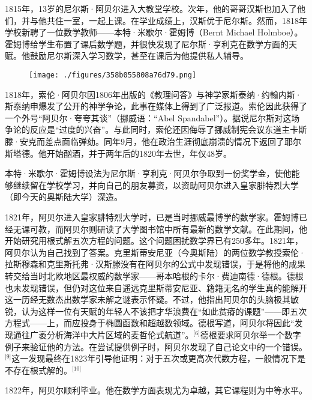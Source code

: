 1815年，13岁的尼尔斯·阿贝尔进入大教堂学校。次年，他的哥哥汉斯也加入了他们，并与他共住一室，一起上课。在学业成绩上，汉斯优于尼尔斯。然而，1818年学校新聘了一位数学教师——本特·米歇尔·霍姆博（Bernt Michael Holmboe）。霍姆博给学生布置了课后数学题，并很快发现了尼尔斯·亨利克在数学方面的天赋。他鼓励尼尔斯深入学习数学，甚至在课后为他提供私人辅导。
\begin{figure}[ht]
\centering
\texttt{[image: ./figures/358b055808a76d79.png]}
\caption{} \label{fig_NRSAB_1}
\end{figure}
1818年，索伦·阿贝尔因1806年出版的《教理问答》与神学家斯泰纳·约翰内斯·斯泰纳申爆发了公开的神学争论，此事在媒体上得到了广泛报道。索伦因此获得了一个外号“阿贝尔·夸夸其谈”（挪威语：“Abel Spandabel”）。据说尼尔斯对这场争论的反应是“过度的兴奋”。与此同时，索伦还因侮辱了挪威制宪会议东道主卡斯滕·安克而差点面临弹劾。同年9月，他在政治生涯彻底崩溃的情况下返回了耶尔斯塔德。他开始酗酒，并于两年后的1820年去世，年仅48岁。

本特·米歇尔·霍姆博设法为尼尔斯·亨利克·阿贝尔争取到一份奖学金，使他能够继续留在学校学习，并向自己的朋友募资，以资助阿贝尔进入皇家腓特烈大学（即今天的奥斯陆大学）深造。

1821年，阿贝尔进入皇家腓特烈大学时，已是当时挪威最博学的数学家。霍姆博已经无课可教，而阿贝尔则研读了大学图书馆中所有最新的数学文献。在此期间，他开始研究用根式解五次方程的问题。这个问题困扰数学界已有250多年。1821年，阿贝尔认为自己找到了答案。克里斯蒂安尼亚（今奥斯陆）的两位数学教授索伦·拉斯穆森和克里斯托弗·汉斯滕没有在阿贝尔的公式中发现错误，于是将他的成果转交给当时北欧地区最权威的数学家——哥本哈根的卡尔·费迪南德·德根。德根也未发现错误，但仍对这位来自遥远克里斯蒂安尼亚、籍籍无名的学生真的能解开这一历经无数杰出数学家未解之谜表示怀疑。不过，他指出阿贝尔的头脑极其敏锐，认为这样一位有天赋的年轻人不该把才华浪费在“如此贫瘠的课题”——即五次方程式——上，而应投身于椭圆函数和超越数领域。德根写道，阿贝尔将因此“发现通往广袤分析海洋中大片区域的麦哲伦式航道”。\(^\text{[6]}\)德根要求阿贝尔举一个数字例子来验证他的方法。在尝试提供例子时，阿贝尔发现了自己论文中的一个错误。\(^\text{[9]}\)这一发现最终在1823年引导他证明：对于五次或更高次代数方程，一般情况下是不存在根式解的。\(^\text{[10]}\)

1822年，阿贝尔顺利毕业。他在数学方面表现尤为卓越，其它课程则为中等水平。
